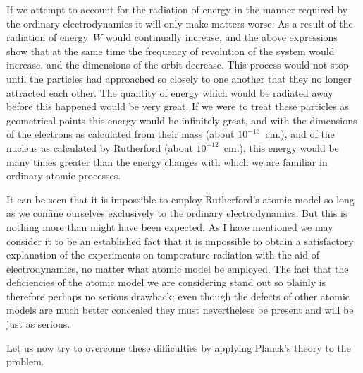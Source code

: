 If we attempt to account for the radiation of energy in the manner
required by the ordinary electrodynamics it will only make matters
worse. As a result of the radiation of energy~$W$ would continually
increase, and the above expressions~ show that at the same time
the frequency of revolution of the system would increase, and the
dimensions of the orbit decrease. This process would not stop until
the particles had approached so closely to one another that they no
longer attracted each other. The quantity of energy which would
be radiated away before this happened would be very great. If we
were to treat these particles as geometrical points this energy would
be infinitely great, and with the dimensions of the electrons as
calculated from their mass (about $10^{-13}$~cm.), and of the nucleus as
calculated by Rutherford (about $10^{-12}$~cm.), this energy would be
many times greater than the energy changes with which we are
familiar in ordinary atomic processes.

It can be seen that it is impossible to employ Rutherford's atomic
model so long as we confine ourselves exclusively to the ordinary
electrodynamics. But this is nothing more than might have been
expected. As I have mentioned we may consider it to be an
established fact that it is impossible to obtain a satisfactory
explanation of the experiments on temperature radiation with the
aid of electrodynamics, no matter what atomic model be employed.
The fact that the deficiencies of the atomic model we are
considering stand out so plainly is therefore perhaps no serious
drawback; even though the defects of other atomic models are
much better concealed they must nevertheless be present and will
be just as serious.

 Let us now try to overcome these
difficulties by applying Planck's theory to the problem.

